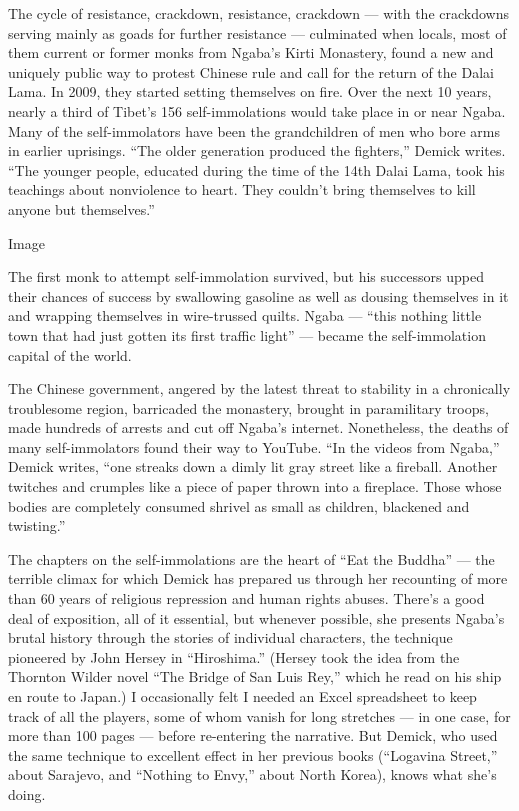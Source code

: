 The cycle of resistance, crackdown, resistance, crackdown --- with the
crackdowns serving mainly as goads for further resistance --- culminated
when locals, most of them current or former monks from Ngaba's Kirti
Monastery, found a new and uniquely public way to protest Chinese rule
and call for the return of the Dalai Lama. In 2009, they started setting
themselves on fire. Over the next 10 years, nearly a third of Tibet's
156 self-immolations would take place in or near Ngaba. Many of the
self-immolators have been the grandchildren of men who bore arms in
earlier uprisings. ``The older generation produced the fighters,''
Demick writes. ``The younger people, educated during the time of the
14th Dalai Lama, took his teachings about nonviolence to heart. They
couldn't bring themselves to kill anyone but themselves.''

Image

The first monk to attempt self-immolation survived, but his successors
upped their chances of success by swallowing gasoline as well as dousing
themselves in it and wrapping themselves in wire-trussed quilts. Ngaba
--- ``this nothing little town that had just gotten its first traffic
light'' --- became the self-immolation capital of the world.

The Chinese government, angered by the latest threat to stability in a
chronically troublesome region, barricaded the monastery, brought in
paramilitary troops, made hundreds of arrests and cut off Ngaba's
internet. Nonetheless, the deaths of many self-immolators found their
way to YouTube. ``In the videos from Ngaba,'' Demick writes, ``one
streaks down a dimly lit gray street like a fireball. Another twitches
and crumples like a piece of paper thrown into a fireplace. Those whose
bodies are completely consumed shrivel as small as children, blackened
and twisting.''

The chapters on the self-immolations are the heart of ``Eat the Buddha''
--- the terrible climax for which Demick has prepared us through her
recounting of more than 60 years of religious repression and human
rights abuses. There's a good deal of exposition, all of it essential,
but whenever possible, she presents Ngaba's brutal history through the
stories of individual characters, the technique pioneered by John Hersey
in ``Hiroshima.'' (Hersey took the idea from the Thornton Wilder novel
``The Bridge of San Luis Rey,'' which he read on his ship en route to
Japan.) I occasionally felt I needed an Excel spreadsheet to keep track
of all the players, some of whom vanish for long stretches --- in one
case, for more than 100 pages --- before re-entering the narrative. But
Demick, who used the same technique to excellent effect in her previous
books (``Logavina Street,'' about Sarajevo, and ``Nothing to Envy,''
about North Korea), knows what she's doing.

